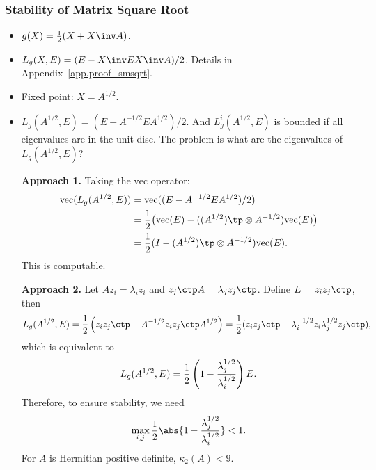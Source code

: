 \documentclass{article}
\begin{document}
\subsubsection{Stability of Matrix Square Root}\label{sec.smsqrt}
\begin{itemize}
    \item $g(X) = \frac{1}{2}(X +X\inv A)$.
    \item $L_{g}(X,E) = (E-X\inv EX\inv A)/2$. Details in
    Appendix~\ref{app.proof_smsqrt}. 
    \item Fixed point: $X = A^{1/2}$.
    \item $L_{g}(A^{1/2},E) = (E-A^{-1/2}EA^{1/2})/2$. And
    $L^i_{g}(A^{1/2},E)$ is bounded if all eigenvalues are in the unit
    disc. The problem is what are the eigenvalues of
    $L_{g}(A^{1/2},E)$?

    \textbf{Approach 1.} Taking the $\mathrm{vec}$ operator:
    \begin{equation}\notag
        \begin{aligned}
            \mathrm{vec}(L_{g}(A^{1/2},E)) 
            & = \mathrm{vec}((E-A^{-1/2}EA^{1/2})/2) \\
            & = \frac{1}{2} \big(\mathrm{vec}(E) - ((A^{1/2})\tp \otimes A^{-1/2}) \mathrm{vec}(E)\big) \\ 
            & = \frac{1}{2} (I - (A^{1/2})\tp \otimes A^{-1/2}) \mathrm{vec}(E).
        \end{aligned}
    \end{equation}
    This is computable.

    \textbf{Approach 2.} Let $Az_i = \lambda_i z_i$ and $z_j\ctp A =
    \lambda_j z_j\ctp$. Define $E = z_iz_j \ctp$, then 
    \begin{equation}\notag
        L_{g}(A^{1/2},E) = \frac{1}{2}\left(z_{i}z_{j}\ctp - A^{-1/2}z_iz_j\ctp A^{1/2}\right) = \frac{1}{2}(z_iz_j\ctp - \lambda_i^{-1/2}z_i\lambda_j^{1/2} z_j\ctp),
    \end{equation}
    which is equivalent to 
    \begin{equation}\notag
        L_{g}(A^{1/2},E) = \frac{1}{2}\left(1-\frac{\lambda_j^{1/2}}{\lambda_i^{1/2}}\right)E.
    \end{equation}
    Therefore, to ensure stability, we need 
    \begin{equation}\notag
        \max_{i,j} \frac{1}{2}\abs{1-\frac{\lambda_j^{1/2}}{\lambda_i^{1/2}}} < 1.
    \end{equation}
    For $A$ is Hermitian positive definite, $\kappa_2(A)<9$.
\end{itemize}
\end{document}
